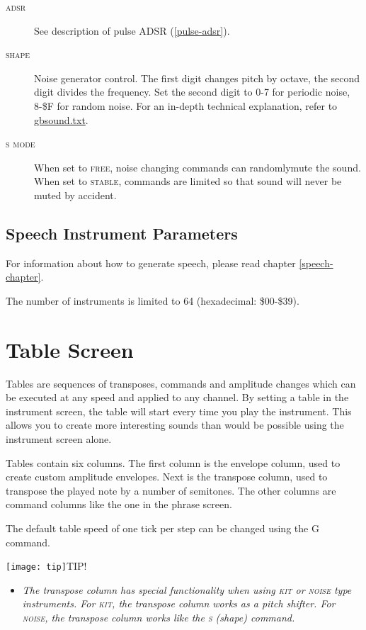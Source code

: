 \begin{description}
	\item[\textsc{adsr}] See description of pulse ADSR (\ref{pulse-adsr}).
	\item[\textsc{shape}] Noise generator control. The first digit changes pitch by octave, the second digit divides the frequency. Set the second digit to 0-7 for periodic noise, 8-\$F for random noise.
        For an in-depth technical explanation, refer to \href{https://google.com\&q=gbsound.txt}{gbsound.txt}.
	\item[\textsc{s mode}] When set to \textsc{free}, noise changing commands can randomly\footnotemark mute the sound. When set to \textsc{stable}, commands are limited so that sound will never be muted by accident.
\end{description}

\subsection{Speech Instrument Parameters}

For information about how to generate speech, please read chapter \ref{speech-chapter}.

The number of instruments is limited to 64 (hexadecimal: \$00-\$39).

\section{Table Screen}

Tables are sequences of transposes, commands and amplitude changes which can be executed at any speed and applied to any channel. By setting a table in the instrument screen, the table will start every time you play the instrument. This allows you to create more interesting sounds than would be possible using the instrument screen alone.

Tables contain six columns. The first column is the envelope column, used to create custom amplitude envelopes. Next is the transpose column, used to transpose the played note by a number of semitones. The other columns are command columns like the one in the phrase screen.

The default table speed of one tick per step can be changed using the G command.

\texttt{[image: tip]}TIP!
\begin{itemize}
	\item \textit{The transpose column has special functionality when using \textsc{kit} or \textsc{noise} type instruments. For \textsc{kit}, the transpose column works as a pitch shifter. For \textsc{noise}, the transpose column works like the \textsc{s} (shape) command.}
\end{itemize}

